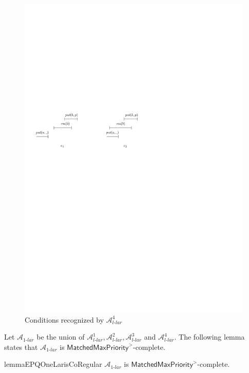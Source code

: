 \begin{figure}[htbp]
  \centering
  \includegraphics[width=0.7 \textwidth]{figures/PIC_HIS_PQ1Lar-rprp.pdf}
  \caption{Conditions recognized by $\mathcal{A}_{\textit{l-lar}}^4$}
  \label{fig:his for APQ1Lar-4}
\end{figure}

Let $\mathcal{A}_{\textit{1-lar}}$ be the union of $\mathcal{A}_{\textit{l-lar}}^1, \mathcal{A}_{\textit{l-lar}}^2, \mathcal{A}_{\textit{l-lar}}^3$ and $\mathcal{A}_{\textit{l-lar}}^4$. The following lemma states that $\mathcal{A}_{\textit{1-lar}}$ is $\mathsf{MatchedMaxPriority}^{>}$-complete.


\begin{restatable}{lemma}{EPQOneLarisCoRegular}
\label{lemma:EPQ1Lar is co-regular}
$\mathcal{A}_{\textit{1-lar}}$ is $\mathsf{MatchedMaxPriority}^{>}$-complete.
\end{restatable}



